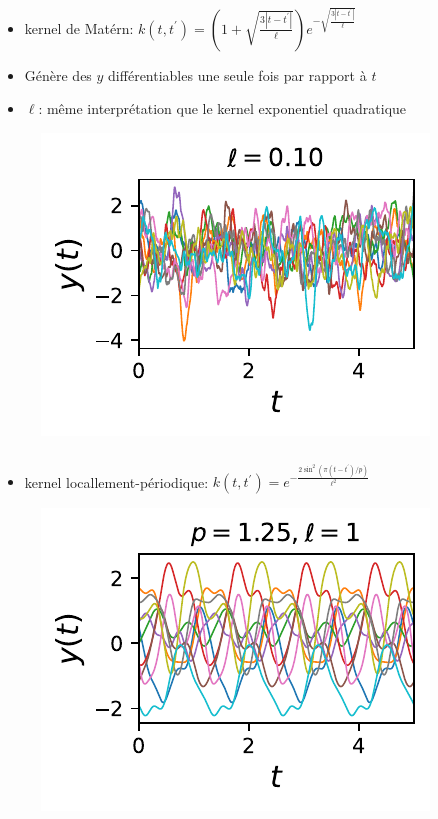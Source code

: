 \documentclass[xcolor=svgnames, t]{beamer}
\begin{document}
\begin{frame}
  \frametitle{\secname}
  \begin{itemize}
    \item kernel de Matérn:
    $k (t, t^\prime) = ( 1 + \sqrt{\frac{3 |t - t^\prime|}{\ell} } ) e^{-\sqrt{\frac{3 |t - t^\prime|}{\ell} }}$
    \item Génère des $y$ différentiables une seule fois par rapport à $t$
    \item $\ell$: même interprétation que le kernel exponentiel quadratique
  \end{itemize}
  \begin{figure}
    \includegraphics{10_gp_time_MaternKernel_0.10.pdf}
  \end{figure}
\end{frame}

\begin{frame}
  \frametitle{\secname}
  \begin{itemize}
    \item kernel locallement-périodique:
    $k (t, t^\prime) = e^{- \frac{2 \sin^2(\pi (t - t^\prime) / p)}{\ell^2}}$ %
  \end{itemize}
  \begin{figure}
    \includegraphics{10_gp_time_PeriodicKernel_1.25.pdf}
  \end{figure}
\end{frame}
\end{document}

